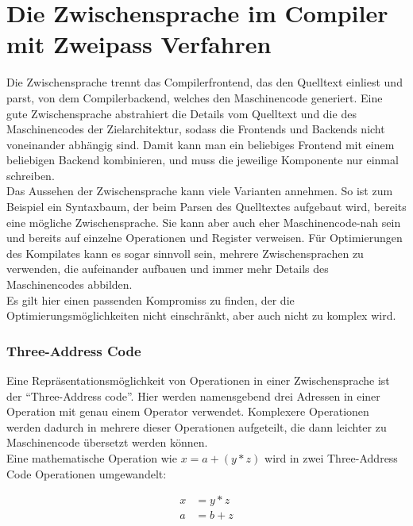 \chapter{Die Zwischensprache im Compiler mit Zweipass Verfahren}
\label{chap:theory:inBetweenLayer}

Die Zwischensprache trennt das Compilerfrontend, das den Quelltext einliest und parst, von dem Compilerbackend, welches den Maschinencode generiert.
Eine gute Zwischensprache abstrahiert die Details vom Quelltext und die des Maschinencodes der Zielarchitektur, sodass die Frontends und Backends nicht voneinander abhängig sind.
Damit kann man ein beliebiges Frontend mit einem beliebigen Backend kombinieren, und muss die jeweilige Komponente nur einmal schreiben.\\
Das Aussehen der Zwischensprache kann viele Varianten annehmen.
So ist zum Beispiel ein Syntaxbaum, der beim Parsen des Quelltextes aufgebaut wird, bereits eine mögliche Zwischensprache.
Sie kann aber auch eher Maschinencode-nah sein und bereits auf einzelne Operationen und Register verweisen.
Für Optimierungen des Kompilates kann es sogar sinnvoll sein, mehrere Zwischensprachen zu verwenden, die aufeinander aufbauen und immer mehr Details des Maschinencodes abbilden.\\
Es gilt hier einen passenden Kompromiss zu finden, der die Optimierungsmöglichkeiten nicht einschränkt, aber auch nicht zu komplex wird.\\

\subsection{Three-Address Code}

Eine Repräsentationsmöglichkeit von Operationen in einer Zwischensprache ist der ``Three-Address code''.
Hier werden namensgebend drei Adressen in einer Operation mit genau einem Operator verwendet\cite{aho:2006}.
Komplexere Operationen werden dadurch in mehrere dieser Operationen aufgeteilt, die dann leichter zu Maschinencode übersetzt werden können.\\
Eine mathematische Operation wie $x = a + (y * z)$ wird in zwei Three-Address Code Operationen umgewandelt:
\begin{figure}[H]
  \begin{align*}
    x &= y * z\\
    a &= b + z
  \end{align*}
\end{figure}

